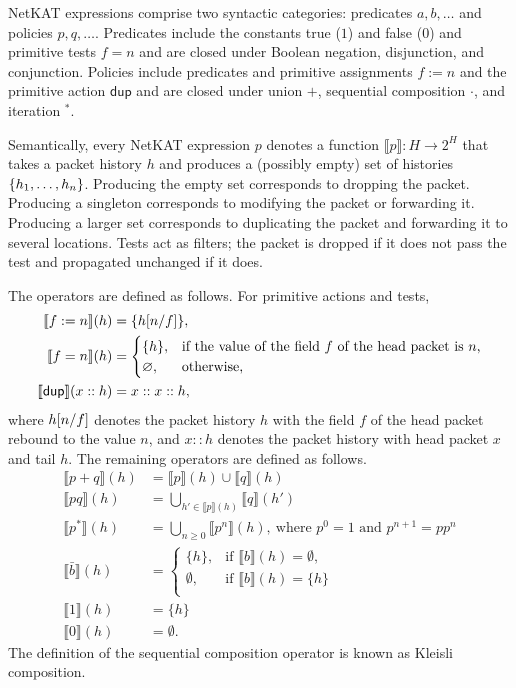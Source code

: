 \documentclass{article}
\newcommand\cset[1]{\{#1\}}
\renewcommand\star{^*}
\renewcommand\powerset[1]{2^{#1}}
\newcommand{\netkat}{NetKAT\xspace}
\newcommand\Hist{H}
\newcommand{\h}{\ensuremath{\mathit{h}}\xspace}
\newcommand{\kw}[1]{\ensuremath{\mathsf{#1}}}
\newcommand{\pdup}{\ensuremath{\mathrel{\kw{dup}}}}
\newcommand{\den}[1]{\ensuremath{\llbracket #1\rrbracket}\xspace}
\begin{document}
\netkat expressions comprise two syntactic categories:
predicates $a,b,\ldots$ and policies $p,q,\ldots$.  Predicates include
the constants true ($1$) and false ($0$) and primitive tests
$f=n$ and are closed under Boolean negation, disjunction, and conjunction.
Policies include predicates and primitive assignments $f := n$ and the
primitive action $\pdup$ and are closed under union $+$, sequential composition $\cdot$, and iteration $\star$.

Semantically, every \netkat expression $p$ denotes a function
$\den p:\Hist\to\powerset\Hist$ that takes a packet history $\h$ and produces a (possibly empty) set of
histories $\cset{\seq h1n}$. Producing the empty set corresponds to dropping the packet.
Producing a singleton corresponds to modifying the packet or forwarding it.
Producing a larger set corresponds to duplicating the packet and forwarding it
to several locations. Tests act as filters; the packet is dropped if it does
not pass the test and propagated unchanged if it does.

The operators are defined as follows. For primitive actions and tests,
\begin{align*}
\den{f := n}(h) &= \{h\subst nf\},\\
\den{f = n}(h) &= \begin{cases}
\{h\}, & \text{if the value of the field $f$ of the head packet is $n$,}\\
\emptyset, & \text{otherwise,}
\end{cases}\\
\den{\pdup}(x :: h) &= x :: x :: h,
\end{align*}
where $h[n/f]$ denotes the packet history $h$ with the field $f$ of the head
packet rebound to the value $n$, and $x::h$ denotes the packet history with head
packet $x$ and tail $h$. The remaining operators are defined as follows.
\begin{align*}
\den{p+q}(h) &= \den p(h) \cup \den q(h)\\
\den{pq}(h) &= \bigcup_{h'\in\den p(h)}\den q(h')\\
\den{p\star}(h) &= \bigcup_{n\geq 0} \den{p^n}(h),\ \text{where $p^0=1$ and $p^{n+1}=pp^n$}\\
\den{\bar b}(h) &= \begin{cases}
\{h\}, & \text{if $\den b(h)=\emptyset$,}\\
\emptyset, & \text{if $\den b(h)=\{h\}$}\\
\end{cases}\\
\den{1}(h) &= \{h\}\\
\den{0}(h) &= \emptyset.
\end{align*}
The definition of the sequential composition operator is known as
Kleisli composition.
\end{document}
